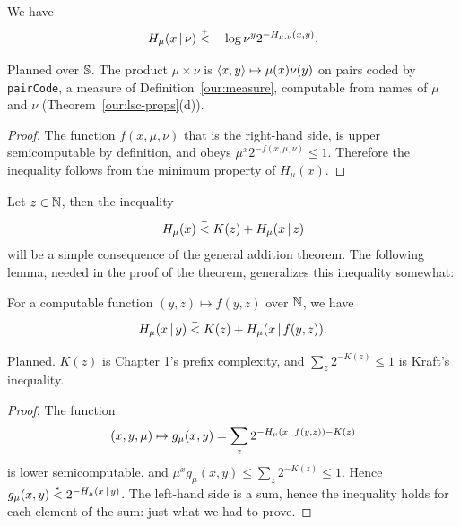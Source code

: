  \begin{proposition}\label{propo:int.H.of.xy}
 We have
 \[
  H_{\mu}(x \,\vert\, \nu) \stackrel{{}_+}{<} -\log \nu^{y} 2^{-H_{\mu,\nu}(x, y)}.
 \]
 \end{proposition}

\begin{formalization}
Planned over $\mathbb{S}$. The product $\mu\times\nu$ is ${\mathopen\langle x,y\mathclose\rangle}\mapsto\mu(x)\nu(y)$ on pairs coded by
\texttt{pairCode}, a measure of Definition~\ref{our:measure}, computable from names of $\mu$ and
$\nu$ (Theorem~\ref{our:lsc-props}(d)).
\end{formalization}
 \begin{proof}
The function $f(x,\mu,\nu)$ that is the right-hand side, is upper
semicomputable by definition, and obeys $\mu^{x}2^{-f(x,\mu,\nu)} \le 1$.
Therefore the inequality follows from the minimum property of
$H_{\mu}(x)$.
 \end{proof}

Let $z \in \mathbb{N}$, then the inequality
 \begin{equation}\label{eq:H.x.cond.z}
  H_{\mu}(x) \stackrel{{}_+}{<} K(z) + H_{\mu}(x \,\vert\, z)
 \end{equation}
 will be a simple consequence of the general addition theorem.
The following lemma, needed in the proof of the theorem,
generalizes this inequality somewhat:

  \begin{lemma}\label{lem:H.x.cond.z}
 For a com\-put\-able func\-tion $(y,z) \mapsto f(y,z)$ over $\mathbb{N}$,
we have
 \[
  H_{\mu}(x \,\vert\, y) \stackrel{{}_+}{<} K(z) + H_{\mu}(x \,\vert\, f(y,z)).
 \]
 \end{lemma}

\begin{formalization}
Planned. $K(z)$ is Chapter 1's prefix complexity, and $\sum_{z}2^{-K(z)}\le 1$ is Kraft's
inequality.
\end{formalization}
 \begin{proof}
  The function
 \[
  (x,y,\mu) \mapsto g_{\mu}(x, y)=\sum_{z} 2^{-H_{\mu}(x \,\vert\, f(y,z))-K(z)}
 \]
 is lower semicomputable,
and $\mu^{x} g_{\mu}(x, y) \le \sum_{z} 2^{-K(z)} \le 1$.
Hence $g_{\mu}(x, y) \stackrel{{}_*}{<} 2^{-H_{\mu}(x \,\vert\, y)}$.
The left-hand side is a sum, hence the inequality holds for each
element of the sum: just what we had to prove.
 \end{proof}

